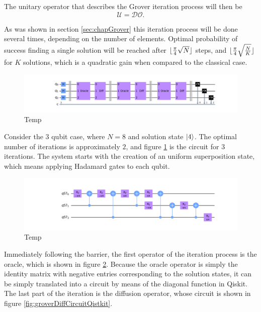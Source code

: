 \documentclass[../../dissertation.tex]{subfiles}
\begin{document}
The unitary operator that describes the Grover iteration process will then be
\begin{equation}
        \mathcal{U} = \mathcal{D}\mathcal{O}.
\end{equation}\par
As was shown in section \ref{sec:chapGrover} this iteration process will be done several times, depending on the number of elements. Optimal probability of success finding a single solution will be reached after $\lfloor\frac{\pi}{4}\sqrt{N}\rfloor$ steps, and $\lfloor\frac{\pi}{4}\sqrt{\frac{N}{K}}\rfloor$ for $K$ solutions, which is a quadratic gain when compared to the classical case.\par

\begin{figure}[!h]
	\centering
	\includegraphics[scale=0.30]{img/Qiskit/GroverQiskit/Circuits/GroverQiskitCirc_N3_M4_S3.png}
	\caption{Temp}
	\label{fig:groverCircuitQistkit}
\end{figure}\par

Consider the $3$ qubit case, where $N=8$ and solution state $\ket{4}$. The optimal number of iterations is approximately $2$, and figure \ref{fig:groverCircuitQistkit} is the circuit for $3$ iterations.
The system starts with the creation of an uniform superposition state, which means applying Hadamard gates to each qubit. 
\begin{figure}[!h]
	\centering
	\includegraphics[scale=0.30]{img/Qiskit/GroverQiskit/Circuits/GroverQiskitCircOracle_N3_M4_S3.png}
	\caption{Temp}
	\label{fig:groverOracleCircuitQistkit}
\end{figure}
Immediately following the barrier, the first operator of the iteration process is the oracle, which is shown in figure \ref{fig:groverOracleCircuitQistkit}. 
Because the oracle operator is simply the identity matrix with negative entries corresponding to the solution states, it can be simply translated into a circuit by means of the diagonal function in Qiskit. The last part of the iteration is the diffusion operator, whose circuit is shown in figure \ref{fig:groverDiffCircuitQistkit}.
\end{document}
